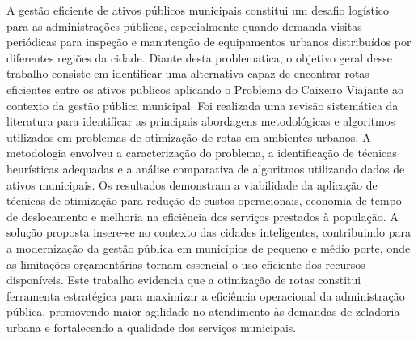 A gestão eficiente de ativos públicos municipais constitui um desafio logístico para as administrações 
públicas, especialmente quando demanda visitas periódicas para inspeção e manutenção de equipamentos 
urbanos distribuídos por diferentes regiões da cidade. 
Diante desta problematica, o objetivo geral desse trabalho consiste em identificar uma alternativa capaz
de encontrar rotas eficientes entre os ativos publicos aplicando o Problema do Caixeiro Viajante ao contexto da gestão pública municipal. 
Foi realizada uma revisão sistemática da literatura para identificar as principais abordagens metodológicas 
e algoritmos utilizados em problemas de otimização de rotas em ambientes urbanos. A metodologia 
envolveu a caracterização do problema, a identificação de técnicas heurísticas adequadas e a análise 
comparativa de algoritmos utilizando dados de ativos municipais. Os resultados demonstram a viabilidade 
da aplicação de técnicas de otimização para redução de custos operacionais, economia de tempo de 
deslocamento e melhoria na eficiência dos serviços prestados à população. A solução proposta insere-se 
no contexto das cidades inteligentes, contribuindo para a modernização da gestão pública em municípios 
de pequeno e médio porte, onde as limitações orçamentárias tornam essencial o uso eficiente dos recursos 
disponíveis. Este trabalho evidencia que a otimização de rotas constitui ferramenta estratégica para 
maximizar a eficiência operacional da administração pública, promovendo maior agilidade no atendimento 
às demandas de zeladoria urbana e fortalecendo a qualidade dos serviços municipais.

